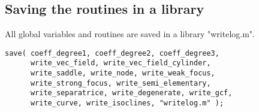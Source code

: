 \documentclass[a4paper,10pt]{article}
\begin{document}
\subsection{Saving the routines in a library}

All global variables and routines are saved in a library "writelog.m".

\begin{lstlisting}[name=writelog]
save( coeff_degree1, coeff_degree2, coeff_degree3,
      write_vec_field, write_vec_field_cylinder,
      write_saddle, write_node, write_weak_focus,
      write_strong_focus, write_semi_elementary,
      write_separatrice, write_degenerate, write_gcf,
      write_curve, write_isoclines, "writelog.m" );
\end{lstlisting}
\end{document}
